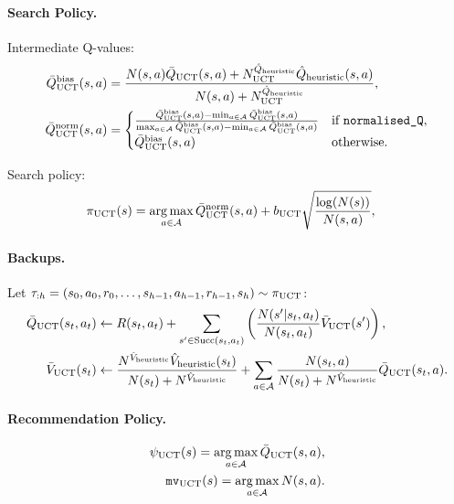     \paragraph{Search Policy.}
        Intermediate Q-values:
        \begin{align}
            \Quctbias(s,a) &= \frac{N(s,a) \Quct(s,a) +  \Nquct \Qinit(s,a)}{N(s,a)+\Nquct}, \\
            \Quctnorm(s,a) &= 
            \begin{cases}
                \frac{\Quctbias(s,a)-\min_{a\in\cl{A}}\Quctbias(s,a)}{\max_{a\in\cl{A}}\Quctbias(s,a)-\min_{a\in\cl{A}}\Quctbias(s,a)} & \text{if } \normalisedq, \\
                \Quctbias(s,a) & \text{otherwise.}
            \end{cases}
        \end{align}

        Search policy:
        \begin{align}
            \piuct(s) &= \argmax_{a\in\cl{A}} \Quctnorm(s,a) + \buct \sqrt{\frac{\log(N(s))}{N(s,a)}}, 
        \end{align}
        

    \paragraph{Backups.}
        Let $\tau_{:h}=(s_0,a_0,r_0,\ldots,s_{h-1},a_{h-1},r_{h-1},s_h)\sim\piuct$:
        \begin{align}
            \Quct(s_t,a_t) &\leftarrow 
                R(s_t,a_t) + \sum_{s' \in \suc{s_t}{a_t}} \left( \frac{N(s'|s_t,a_t)}{N(s_t,a_t)} \Vuct(s') \right), 
                        \\ 
            \Vuct(s_t) &\leftarrow \frac{\Nv \Vinit(s_t)}{N(s_t)+\Nv} 
                + \sum_{a\in\cl{A}} \frac{N(s_t,a)}{N(s_t)+\Nv} \Quct(s_t,a).
        \end{align}

    \paragraph{Recommendation Policy.}
        \begin{align}
            \psiuct(s)=\argmax_{a\in\cl{A}}\Quct(s,a),  \\
            \mvuct(s) = \argmax_{a\in\cl{A}} N(s,a). 
        \end{align}





